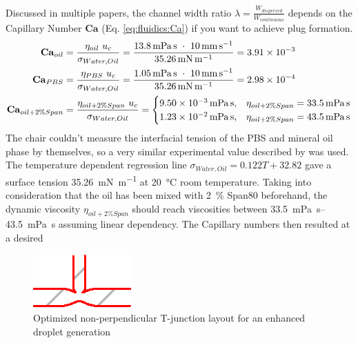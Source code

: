 Discussed in multiple papers, the channel width ratio $\lambda = \frac{W_{dispersed}}{W_{continuous}}$ depends on the Capillary Number $\mathbf{Ca}$ (Eq. \ref{eq:fluidics:Ca}) if you want to achieve plug formation.\cite{lit:fluidics:droplet:formation:t-junction:squeezing_dripping}\cite{lit:fluidics:droplet:formation:t-junction:numerical}
\begin{align}
\mathbf{Ca}_{oil} & = \frac{\eta_{oil}\ u_c}{\sigma_{Water,Oil}} = \frac{\SI{13.8}{\milli\pascal\second}\ \cdot\ \SI{10}{\milli\meter\per\second}}{\SI{35.26}{\milli\newton\per\m}} = \SI{3.91e-3}{}
\label{eq:fluidics:Ca:oil}\\	
\mathbf{Ca}_{PBS} &= \frac{\eta_{PBS}\ u_c}{\sigma_{Water,Oil}} = \frac{\SI{1.05}{\milli\pascal\second}\ \cdot\ \SI{10}{\milli\meter\per\second}}{\SI{35.26}{\milli\newton\per\m}} = \SI{2.98e-4}{} 	\label{eq:fluidics:Ca:PBS}
\\\mathbf{Ca}_{oil+2\%Span} & = \frac{\eta_{oil+2\%Span}\ u_c}{\sigma_{Water,Oil}} =
\begin{cases} \mbox{\SI{9.50e-3}{\milli\pascal\second},} & \mbox{}\eta_{oil+2\%Span} = \SI{33.5}{\milli\pascal\second} \\ \mbox{\SI{1.23e-2}{\milli\pascal\second},} & \mbox{} \eta_{oil+2\%Span} = \SI{43.5}{\milli\pascal\second} \end{cases}\label{eq:fluidics:Ca:oil+span}
\end{align}
 The chair couldn't measure the interfacial tension of the PBS and mineral oil phase by themselves, so a very similar experimental value described by \citet{lit:fluidics:interf_tension_oil_water} was used. The temperature dependent regression line $\sigma_{Water,Oil} =  0.122T + 32.82$ gave a surface tension \SI{35.26}{\milli\newton\per\m} at \SI{20}{\degreeCelsius} room temperature. 
 \newpage
 Taking into consideration that the oil has been mixed with \SI{2}{\percent} Span80 beforehand, the dynamic viscosity $\eta_{oil+2\%Span}$ should reach viscosities between \SIrange{33.5}{43.5}{\milli\pascal\second} assuming linear dependency. The Capillary numbers then resulted at a desired 
 \begin{figure}
		\centering
		\includegraphics[trim={0mm 0mm 0mm 1mm},width=\linewidth]{Ressourcen/AutoCAD/T_junction_round_zoomed}
		\caption{Optimized non-perpendicular T-junction layout for an enhanced droplet generation}
		\label{fig:CAD:t-junction-zoomed}	
\end{figure}
